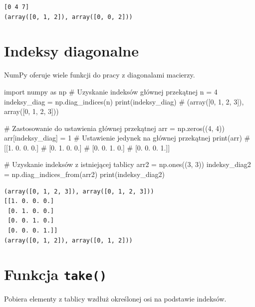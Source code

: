 \documentclass[
  polish,
  letterpaper,
  DIV=11,
  numbers=noendperiod]{scrreprt}
\newenvironment{Shaded}{\begin{snugshade}}{\end{snugshade}}
\newcommand{\BuiltInTok}[1]{\textcolor[rgb]{0.00,0.23,0.31}{#1}}
\newcommand{\CommentTok}[1]{\textcolor[rgb]{0.37,0.37,0.37}{#1}}
\newcommand{\DecValTok}[1]{\textcolor[rgb]{0.68,0.00,0.00}{#1}}
\newcommand{\ImportTok}[1]{\textcolor[rgb]{0.00,0.46,0.62}{#1}}
\newcommand{\NormalTok}[1]{\textcolor[rgb]{0.00,0.23,0.31}{#1}}
\newcommand{\OperatorTok}[1]{\textcolor[rgb]{0.37,0.37,0.37}{#1}}
\begin{document}
\begin{verbatim}
[0 4 7]
(array([0, 1, 2]), array([0, 0, 2]))
\end{verbatim}

\section{Indeksy diagonalne}\label{indeksy-diagonalne}

NumPy oferuje wiele funkcji do pracy z diagonalami macierzy.

\begin{Shaded}
\begin{Highlighting}[]
\ImportTok{import}\NormalTok{ numpy }\ImportTok{as}\NormalTok{ np}
\CommentTok{\# Uzyskanie indeksów głównej przekątnej}
\NormalTok{n }\OperatorTok{=} \DecValTok{4}
\NormalTok{indeksy\_diag }\OperatorTok{=}\NormalTok{ np.diag\_indices(n)}
\BuiltInTok{print}\NormalTok{(indeksy\_diag)  }\CommentTok{\# (array([0, 1, 2, 3]), array([0, 1, 2, 3]))}

\CommentTok{\# Zastosowanie do ustawienia głównej przekątnej}
\NormalTok{arr }\OperatorTok{=}\NormalTok{ np.zeros((}\DecValTok{4}\NormalTok{, }\DecValTok{4}\NormalTok{))}
\NormalTok{arr[indeksy\_diag] }\OperatorTok{=} \DecValTok{1}  \CommentTok{\# Ustawienie jedynek na głównej przekątnej}
\BuiltInTok{print}\NormalTok{(arr)}
\CommentTok{\# [[1. 0. 0. 0.]}
\CommentTok{\#  [0. 1. 0. 0.]}
\CommentTok{\#  [0. 0. 1. 0.]}
\CommentTok{\#  [0. 0. 0. 1.]]}

\CommentTok{\# Uzyskanie indeksów z istniejącej tablicy}
\NormalTok{arr2 }\OperatorTok{=}\NormalTok{ np.ones((}\DecValTok{3}\NormalTok{, }\DecValTok{3}\NormalTok{))}
\NormalTok{indeksy\_diag2 }\OperatorTok{=}\NormalTok{ np.diag\_indices\_from(arr2)}
\BuiltInTok{print}\NormalTok{(indeksy\_diag2)}
\end{Highlighting}
\end{Shaded}

\begin{verbatim}
(array([0, 1, 2, 3]), array([0, 1, 2, 3]))
[[1. 0. 0. 0.]
 [0. 1. 0. 0.]
 [0. 0. 1. 0.]
 [0. 0. 0. 1.]]
(array([0, 1, 2]), array([0, 1, 2]))
\end{verbatim}

\section{\texorpdfstring{Funkcja
\texttt{take()}}{Funkcja take()}}\label{funkcja-take}

Pobiera elementy z tablicy wzdłuż określonej osi na podstawie indeksów.
\end{document}
